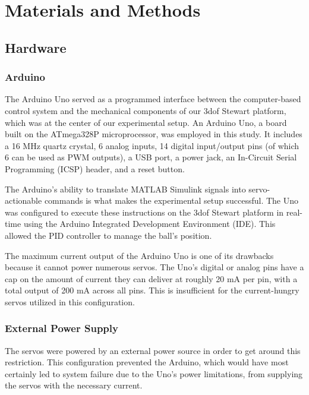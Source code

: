 \section{Materials and Methods}
\subsection{Hardware}
\subsubsection{Arduino}%

The Arduino Uno served as a programmed interface between the computer-based control system and the mechanical components of our 3dof Stewart platform, which was at the center of our experimental setup. An Arduino Uno, a board built on the ATmega328P microprocessor, was employed in this study. It includes a 16 MHz quartz crystal, 6 analog inputs, 14 digital input/output pins (of which 6 can be used as PWM outputs), a USB port, a power jack, an In-Circuit Serial Programming (ICSP) header, and a reset button.\cite{atmel_atmega328p_nodate}\newline

The Arduino's ability to translate MATLAB Simulink signals into servo-actionable commands is what makes the experimental setup successful. The Uno was configured to execute these instructions on the 3dof Stewart platform in real-time using the Arduino Integrated Development Environment (IDE). This allowed the PID controller to manage the ball's position.\newline

The maximum current output of the Arduino Uno is one of its drawbacks because it cannot power numerous servos. The Uno's digital or analog pins have a cap on the amount of current they can deliver at roughly 20 mA per pin, with a total output of 200 mA across all pins\cite{atmel_atmega328p_nodate}. This is insufficient for the current-hungry servos utilized in this configuration.


\subsubsection{External Power Supply}

The servos were powered by an external power source in order to get around this restriction. This configuration prevented the Arduino, which would have most certainly led to system failure due to the Uno's power limitations, from supplying the servos with the necessary current.\newline 

